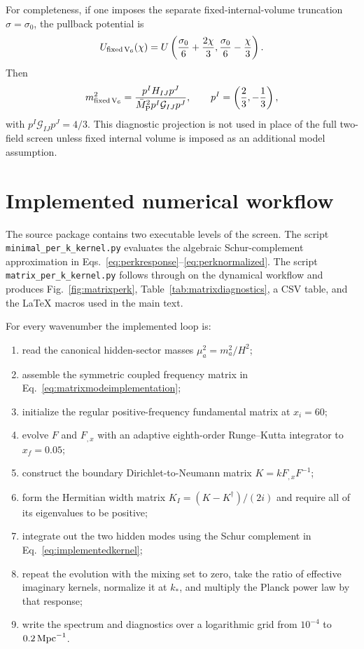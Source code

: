 \documentclass[aps,prd,twocolumn,superscriptaddress,nofootinbib,longbibliography,floatfix]{revtex4-2}
\newcommand{\Mpl}{\bar M_{\rm P}}
\begin{document}
For completeness, if one imposes the separate fixed-internal-volume truncation $\sigma=\sigma_0$, the pullback potential is
\begin{equation}
U_{\rm fixed\,V_6}(\chi)=U\left(\frac{\sigma_0}{6}+\frac{2\chi}{3},
\frac{\sigma_0}{6}-\frac{\chi}{3}\right).
\end{equation}
Then
\begin{equation}
 m_{\rm fixed\,V_6}^2
 =\frac{p^I H_{IJ}p^J}{\Mpl^2 p^I\mathcal G_{IJ}p^J},
\qquad
p^I=\left(\frac23,-\frac13\right),
\end{equation}
with $p^I\mathcal G_{IJ}p^J=4/3$. This diagnostic projection is not used in place of the full two-field screen unless fixed internal volume is imposed as an additional model assumption.

\section{Implemented numerical workflow}
\label{app:numericalworkflow}
The source package contains two executable levels of the screen.  The script \texttt{minimal\_per\_k\_kernel.py} evaluates the algebraic Schur-complement approximation in Eqs.~\eqref{eq:perkresponse}--\eqref{eq:perknormalized}.  The script \texttt{matrix\_per\_k\_kernel.py} follows through on the dynamical workflow and produces Fig.~\ref{fig:matrixperk}, Table~\ref{tab:matrixdiagnostics}, a CSV table, and the \LaTeX{} macros used in the main text.

For every wavenumber the implemented loop is:
\begin{enumerate}
\item read the canonical hidden-sector masses $\mu_a^2=m_a^2/H^2$;
\item assemble the symmetric coupled frequency matrix in Eq.~\eqref{eq:matrixmodeimplementation};
\item initialize the regular positive-frequency fundamental matrix at $x_i=60$;
\item evolve $F$ and $F_{,x}$ with an adaptive eighth-order Runge--Kutta integrator to $x_f=0.05$;
\item construct the boundary Dirichlet-to-Neumann matrix $K=kF_{,x}F^{-1}$;
\item form the Hermitian width matrix $K_I=(K-K^\dagger)/(2i)$ and require all of its eigenvalues to be positive;
\item integrate out the two hidden modes using the Schur complement in Eq.~\eqref{eq:implementedkernel};
\item repeat the evolution with the mixing set to zero, take the ratio of effective imaginary kernels, normalize it at $k_*$, and multiply the Planck power law by that response;
\item write the spectrum and diagnostics over a logarithmic grid from $10^{-4}$ to $0.2\,{\rm Mpc}^{-1}$.
\end{enumerate}
\end{document}
